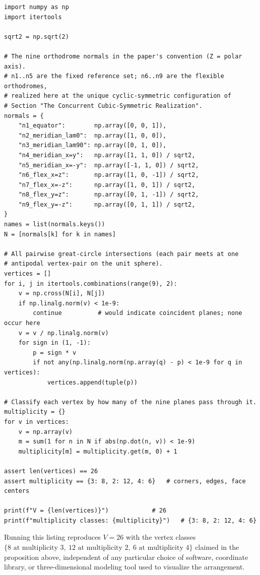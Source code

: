 \documentclass[11pt,fleqn]{book}
\numberwithin{equation}{chapter}
\theoremstyle{plain}
\theoremstyle{definition}
\theoremstyle{remark}
\begin{document}
\begin{lstlisting}[caption={Reference generator for the nine cubic-symmetric orthodrome normals, their pairwise intersections, and vertex multiplicity classification.}, label={lst:nine-normals}]
import numpy as np
import itertools

sqrt2 = np.sqrt(2)

# The nine orthodrome normals in the paper's convention (Z = polar axis).
# n1..n5 are the fixed reference set; n6..n9 are the flexible orthodromes,
# realized here at the unique cyclic-symmetric configuration of
# Section "The Concurrent Cubic-Symmetric Realization".
normals = {
    "n1_equator":        np.array([0, 0, 1]),
    "n2_meridian_lam0":  np.array([1, 0, 0]),
    "n3_meridian_lam90": np.array([0, 1, 0]),
    "n4_meridian_x=y":   np.array([1, 1, 0]) / sqrt2,
    "n5_meridian_x=-y":  np.array([-1, 1, 0]) / sqrt2,
    "n6_flex_x=z":       np.array([1, 0, -1]) / sqrt2,
    "n7_flex_x=-z":      np.array([1, 0, 1]) / sqrt2,
    "n8_flex_y=z":       np.array([0, 1, -1]) / sqrt2,
    "n9_flex_y=-z":      np.array([0, 1, 1]) / sqrt2,
}
names = list(normals.keys())
N = [normals[k] for k in names]

# All pairwise great-circle intersections (each pair meets at one
# antipodal vertex-pair on the unit sphere).
vertices = []
for i, j in itertools.combinations(range(9), 2):
    v = np.cross(N[i], N[j])
    if np.linalg.norm(v) < 1e-9:
        continue          # would indicate coincident planes; none occur here
    v = v / np.linalg.norm(v)
    for sign in (1, -1):
        p = sign * v
        if not any(np.linalg.norm(np.array(q) - p) < 1e-9 for q in vertices):
            vertices.append(tuple(p))

# Classify each vertex by how many of the nine planes pass through it.
multiplicity = {}
for v in vertices:
    v = np.array(v)
    m = sum(1 for n in N if abs(np.dot(n, v)) < 1e-9)
    multiplicity[m] = multiplicity.get(m, 0) + 1

assert len(vertices) == 26
assert multiplicity == {3: 8, 2: 12, 4: 6}   # corners, edges, face centers

print(f"V = {len(vertices)}")            # 26
print(f"multiplicity classes: {multiplicity}")   # {3: 8, 2: 12, 4: 6}
\end{lstlisting}

Running this listing reproduces \(V=26\) with the vertex classes \(\{8 \text{ at multiplicity } 3,\ 12 \text{ at multiplicity } 2,\ 6 \text{ at multiplicity } 4\}\) claimed in the proposition above, independent of any particular choice of software, coordinate library, or three-dimensional modeling tool used to visualize the arrangement.
\end{document}
